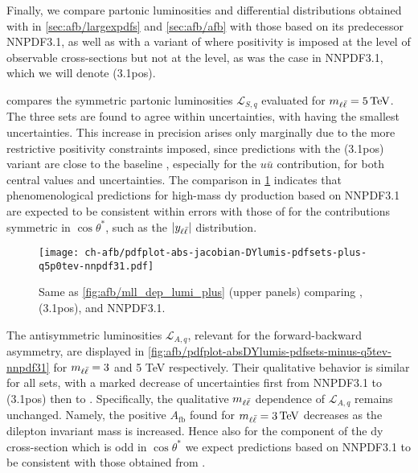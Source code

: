 
Finally, we compare partonic luminosities and \lhc differential distributions
obtained with  in \cref{sec:afb/largexpdfs} and \cref{sec:afb/afb}
with those based  on its predecessor NNPDF3.1, as well as with a variant of
 where positivity is imposed at the level of observable
cross-sections but not at the \pdf level, as was the case in  NNPDF3.1, which
we will denote (3.1pos).

 compares the 
symmetric partonic luminosities $\mathcal{L}_{S,q}$ evaluated for
$\mll=\SI{5}{\tera\electronvolt}$.
%
The three sets are found to agree within uncertainties,
with  having the smallest uncertainties.
%
This increase in precision arises only marginally due to the more restrictive
positivity constraints imposed, since predictions with the (3.1pos)
variant  are close to the baseline , especially  for the $u\bar{u}$
contribution, for both central values and uncertainties.
%
The comparison in \cref{fig:afb/pdfplot-absDYlumis-pdfsets-plus-q5tev-nnpdf31}
indicates that phenomenological predictions for high-mass \acrlong{dy}
production based on NNPDF3.1 are expected
to be consistent within errors with those of  for the contributions
symmetric in $\cos\theta^*$, such as the $|y_{\ell\bar{\ell}}|$ distribution.

\begin{figure}[!t]
 \centering
 \texttt{[image: ch-afb/pdfplot-abs-jacobian-DYlumis-pdfsets-plus-q5p0tev-nnpdf31.pdf]}
 \caption{Same as \cref{fig:afb/mll_dep_lumi_plus} (upper panels) comparing
, (3.1pos), and NNPDF3.1.
 }    
 \label{fig:afb/pdfplot-absDYlumis-pdfsets-plus-q5tev-nnpdf31}
\end{figure}

The antisymmetric luminosities $\mathcal{L}_{A,q}$, relevant for the
forward-backward asymmetry, are displayed in \cref{fig:afb/pdfplot-absDYlumis-pdfsets-minus-q5tev-nnpdf31}
for $m_{\ell\bar{\ell}} = 3$ and 5 TeV respectively.
%
Their qualitative behavior is similar for all  \pdf sets,
with a marked decrease of \pdf uncertainties first from NNPDF3.1
to  (3.1pos)  then
to .
%
Specifically, the qualitative $m_{\ell\bar{\ell}}$ dependence
of $\mathcal{L}_{A,q}$ remains unchanged. Namely, the positive $A_{\text{fb}}$
found for $\mll= \SI{3}{\tera\electronvolt}$ decreases 
as the dilepton invariant mass is increased.
%
Hence also for the component of the \acrlong{dy} cross-section which is odd
in $\cos\theta^*$ we expect \lhc predictions based on NNPDF3.1 to be consistent
with those obtained from .

